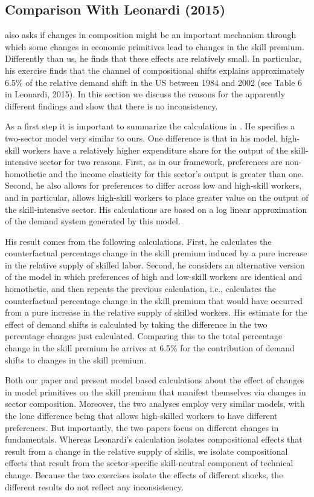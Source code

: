 \documentclass[12pt,english]{article}
\begin{document}
\subsection{Comparison With Leonardi (2015)}

{\normalsize \citet{Leo15} also asks if changes in composition might be an
important mechanism through which some changes in economic primitives lead
to changes in the skill premium. Differently than us, he finds that these
effects are relatively small. In particular, his exercise finds that the
channel of compositional shifts explains approximately 6.5\% of the relative
demand shift in the US between 1984 and 2002 (see Table 6 in Leonardi,
2015). In this section we discuss the reasons for the apparently different
findings and show that there is no inconsistency. }

{\normalsize As a first step it is important to summarize the calculations
in \citet{Leo15}. He specifies a two-sector model very similar to ours. One
difference is that in his model, high-skill workers have a relatively higher
expenditure share for the output of the skill-intensive sector for two
reasons. First, as in our framework, preferences are non-homothetic and the
income elasticity for this sector's output is greater than one. Second, he
also allows for preferences to differ across low and high-skill workers, and
in particular, allows high-skill workers to place greater value on the
output of the skill-intensive sector. His calculations are based on a log
linear approximation of the demand system generated by this model. }

{\normalsize His result comes from the following calculations. First, he
calculates the counterfactual percentage change in the skill premium induced
by a pure increase in the relative supply of skilled labor. Second, he
considers an alternative version of the model in which preferences of high
and low-skill workers are identical and homothetic, and then repeats the
previous calculation, i.e., calculates the counterfactual percentage change
in the skill premium that would have occurred from a pure increase in the
relative supply of skilled workers. His estimate for the effect of demand
shifts is calculated by taking the difference in the two percentage changes
just calculated. Comparing this to the total percentage change in the skill
premium he arrives at 6.5\% for the contribution of demand shifts to changes
in the skill premium. }

{\normalsize Both our paper and \citet{Leo15} present model based
calculations about the effect of changes in model primitives on the skill
premium that manifest themselves via changes in sector composition.
Moreover, the two analyses employ very similar models, with the lone
difference being that \citet{Leo15} allows high-skilled workers to have
different preferences. But importantly, the two papers focus on different
changes in fundamentals. Whereas Leonardi's calculation isolates
compositional effects that result from a change in the relative supply of
skills, we isolate compositional effects that result from the
sector-specific skill-neutral component of technical change. Because the two
exercises isolate the effects of different shocks, the different results do
not reflect any inconsistency. }
\end{document}
